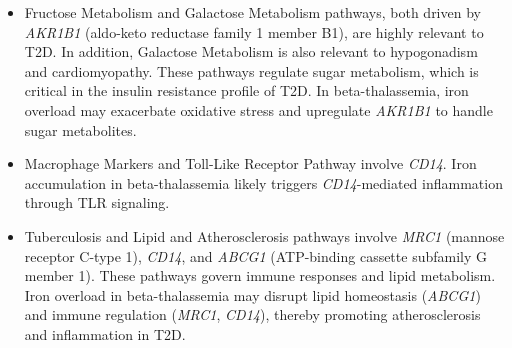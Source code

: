 \begin{itemize}
    \item Fructose Metabolism and Galactose Metabolism pathways, both driven by \textit{AKR1B1} (aldo-keto reductase family 1 member B1), are highly relevant to T2D. In addition, Galactose Metabolism is also relevant to hypogonadism and cardiomyopathy. These pathways regulate sugar metabolism, which is critical in the insulin resistance profile of T2D. In beta-thalassemia, iron overload may exacerbate oxidative stress and upregulate \textit{AKR1B1} to handle sugar metabolites.

    \item Macrophage Markers and Toll-Like Receptor Pathway involve \textit{CD14}. Iron accumulation in beta-thalassemia likely triggers \textit{CD14}-mediated inflammation through TLR signaling.

    \item Tuberculosis and Lipid and Atherosclerosis pathways involve \textit{MRC1} (mannose receptor C-type 1), \textit{CD14}, and \textit{ABCG1} (ATP-binding cassette subfamily G member 1). These pathways govern immune responses and lipid metabolism. Iron overload in beta-thalassemia may disrupt lipid homeostasis (\textit{ABCG1}) and immune regulation (\textit{MRC1}, \textit{CD14}), thereby promoting atherosclerosis and inflammation in T2D.
\end{itemize}


